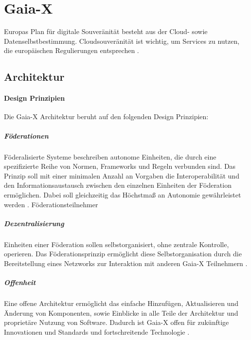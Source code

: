 \section{Gaia-X}
\label{sec:grundlagen:gaia-x}
Europas Plan für digitale Souveränität besteht aus der Cloud- sowie Datenselbstbestimmung.
Cloudsouveränität ist wichtig, um Services zu nutzen, die europäischen Regulierungen entsprechen \cite{Braud2021}.


\subsection{Architektur}
\label{subsec:gaia-x:architektur}
\paragraph{Design Prinzipien}
Die Gaia-X Architektur beruht auf den folgenden Design Prinzipien:

\subparagraph{Föderationen}
Föderalisierte Systeme beschreiben autonome Einheiten, die durch eine spezifizierte Reihe von Normen,
Frameworks und Regeln verbunden sind.
Das Prinzip soll mit einer minimalen Anzahl an Vorgaben die Interoperabilität und den Informationsaustausch
zwischen den einzelnen Einheiten der Föderation ermöglichen. 
Dabei soll gleichzeitig das Höchstmaß an Autonomie gewährleistet werden \cite{GaiaXArchitecture2021}.
Föderationsteilnehmer 

\subparagraph{Dezentralisierung}
Einheiten einer Föderation sollen selbstorganisiert, ohne zentrale Kontrolle, operieren.
Das Föderationsprinzip ermöglicht diese Selbstorganisation durch die Bereitstellung eines Netzworks
zur Interaktion mit anderen Gaia-X Teilnehmern \cite{GaiaXArchitecture2021}.

\subparagraph{Offenheit}
Eine offene Architektur ermöglicht das einfache Hinzufügen, Aktualisieren und Änderung von Komponenten, sowie
Einblicke in alle Teile der Architektur und proprietäre Nutzung von Software.
Dadurch ist Gaia-X offen für zukünftige Innovationen und Standards und fortschreitende Technologie \cite{GaiaXArchitecture2021}.


